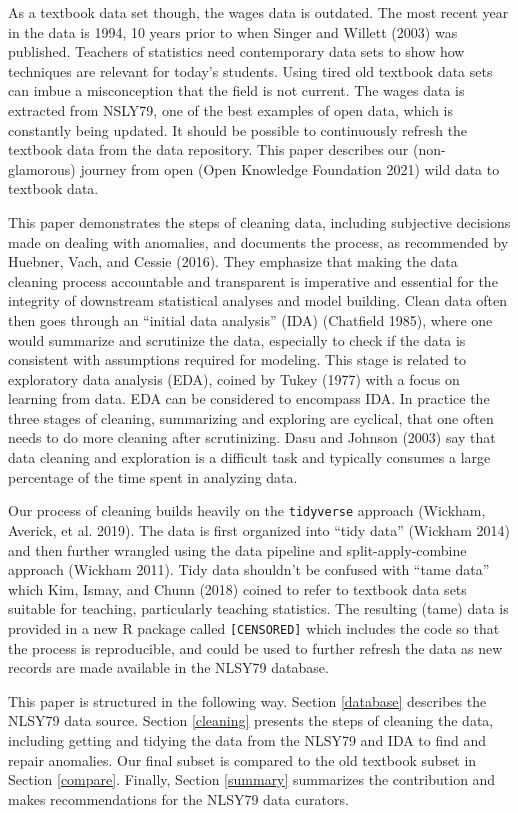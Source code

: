 \documentclass{article}
\begin{document}
As a textbook data set though, the wages data is outdated. The most recent year in the data is 1994, 10 years prior to when Singer and Willett (2003) was published. Teachers of statistics need contemporary data sets to show how techniques are relevant for today's students. Using tired old textbook data sets can imbue a misconception that the field is not current. The wages data is extracted from NSLY79, one of the best examples of open data, which is constantly being updated. It should be possible to continuously refresh the textbook data from the data repository. This paper describes our (non-glamorous) journey from open (Open Knowledge Foundation 2021) wild data to textbook data.

This paper demonstrates the steps of cleaning data, including subjective decisions made on dealing with anomalies, and documents the process, as recommended by Huebner, Vach, and Cessie (2016). They emphasize that making the data cleaning process accountable and transparent is imperative and essential for the integrity of downstream statistical analyses and model building. Clean data often then goes through an ``initial data analysis'' (IDA) (Chatfield 1985), where one would summarize and scrutinize the data, especially to check if the data is consistent with assumptions required for modeling. This stage is related to exploratory data analysis (EDA), coined by Tukey (1977) with a focus on learning from data. EDA can be considered to encompass IDA. In practice the three stages of cleaning, summarizing and exploring are cyclical, that one often needs to do more cleaning after scrutinizing. Dasu and Johnson (2003) say that data cleaning and exploration is a difficult task and typically consumes a large percentage of the time spent in analyzing data.

Our process of cleaning builds heavily on the \texttt{tidyverse} approach (Wickham, Averick, et al. 2019). The data is first organized into ``tidy data'' (Wickham 2014) and then further wrangled using the data pipeline and split-apply-combine approach (Wickham 2011). Tidy data shouldn't be confused with ``tame data'' which Kim, Ismay, and Chunn (2018) coined to refer to textbook data sets suitable for teaching, particularly teaching statistics. The resulting (tame) data is provided in a new R package called \texttt{[CENSORED]} which includes the code so that the process is reproducible, and could be used to further refresh the data as new records are made available in the NLSY79 database.

This paper is structured in the following way. Section \ref{database} describes the NLSY79 data source. Section \ref{cleaning} presents the steps of cleaning the data, including getting and tidying the data from the NLSY79 and IDA to find and repair anomalies. Our final subset is compared to the old textbook subset in Section \ref{compare}. Finally, Section \ref{summary} summarizes the contribution and makes recommendations for the NLSY79 data curators.
\end{document}

